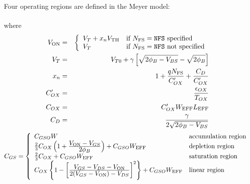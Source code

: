 Four operating regions are defined in the Meyer model:\\[0.1in]
\hspace*{\fill}\\[0.1in]
where
\begin{eqnarray}
V_{\ms{ON}}  & = & \left\{ \begin{array}{ll}
            V_{T} +  x_nV_{\ms{TH}} &
		      \mbox{if } \NFS = {\tt NFS} \mbox{ specified}\\
            V_{T}                   & \mbox{if } \NFS = {\tt NFS}
                                       \mbox{ not specified}
            \end{array} \right.\\ %
V_{T} & = & V_{T0} + \GAMMA
        \left[\sqrt{\PHI - V_{BS}}-\sqrt{\PHI} \right]\\
x_n      & = & 1 + {{q \NFS} \over {C'_{OX}}} + {{C_D} \over {C'_{OX}}}\\
C'_{OX}&=&{{\epsilon_{OX}} \over { \TOX}}\\
C_{OX}&=& C'_{OX}\W_{\ms{EFF}} L_{\ms{EFF}}\\
C_D & = & {{\textstyle\GAMMA} \over {\textstyle 2 \sqrt{\PHI - V_{BS}}}}
\end{eqnarray}
\begin{equation}
C_{GS} =  \left\{ \begin{array}{ll}
            \CGSO\W                     & \mbox{accumulation region}\\
            \frac{2}{3} C_{OX}
             \left( 1+ {{\textstyle V_{\ms{ON}}
             - V_{GS}} \over {\textstyle\PHI}}\right)
            + \CGSO\W_{\ms{EFF}}                   & \mbox{depletion region}\\
           \frac{2}{3} C_{OX} + \CGSO\W_{\ms{EFF}}  & \mbox{saturation region}\\
            C_{OX} \left\{ 1 - \left[
              {{\textstyle V_{GS} - V_{DS} - V_{\ms{ON}}} \over
               {\textstyle 2(V_{GS}-V_{\ms{ON}}) - V_{DS}}} \right]^2\right\}
            + \CGSO\W_{\ms{EFF}}  & \mbox{linear region}

            \end{array}
            \right. %
\end{equation}
